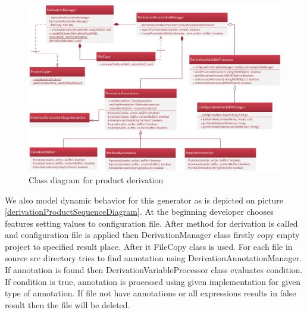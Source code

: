 \documentclass[11pt,slovak,a4paper,twoside]{article}
\begin{document}
\begin{figure}[t]  %
					\begin{center}
									\includegraphics[width=\linewidth]{fig/DerivationClass.png}
									\caption{Class diagram for product derivation}
									\label{derivationProductClassDiagram}
					\end{center}
\end{figure}


We also model dynamic behavior for this generator as is depicted on picture \ref{derivationProductSequenceDiagram}. At the beginning developer chooses features setting values to configuration file. After method for derivation is called and configuration file is applied then DerivationManager class firstly copy empty project to specified result place. After it FileCopy class is used. For each file in source src directory tries to find annotation using DerivationAnnotationManager. If annotation is found then DerivationVariableProcessor class evaluates condition. If condition is true, annotation is processed using given implementation for given type of annotation. If file not have annotations or all expressions results in false result then the file will be deleted. 
\end{document}
